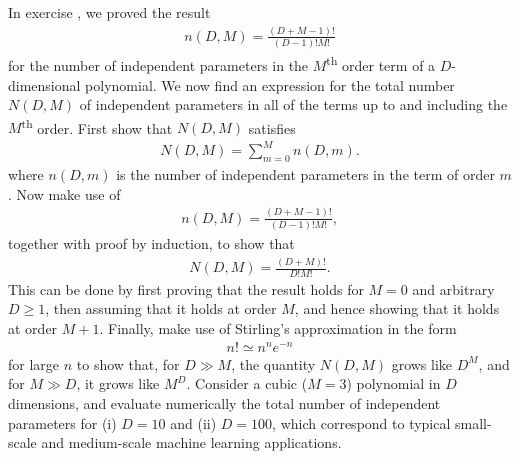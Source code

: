 \begin{question}{1.16}
	In exercise , we proved the result
	\begin{align*}
		n(D, M) = \frac{(D + M - 1)!}{(D-1)!M!}
	\end{align*}
	for the number of independent parameters in the $M$\textsuperscript{th} order term of a $D$-dimensional polynomial. We now find an expression for the total number $N(D, M)$ of independent parameters in all of the terms up to and including the $M$\textsuperscript{th} order. First show that $N(D, M)$ satisfies
	\begin{align*}
		N(D, M) = \sum_{m = 0}^{M} n(D, m).
	\end{align*}
	where $n(D, m)$ is the number of independent parameters in the term of order $m$. Now make use of
	\begin{align*}
		n(D,M) = \frac{(D + M - 1)!}{(D-1)!M!},
	\end{align*}
	together with proof by induction, to show that
	\begin{align*}
		N(D, M) = \frac{(D + M)!}{D!M!}.
	\end{align*}
	This can be done by first proving that the result holds for $M = 0$ and arbitrary $D \geq 1$, then assuming that it holds at order $M$, and hence showing that it holds at order $M + 1$. Finally, make use of Stirling's approximation in the form
	\begin{align*}
		n! \simeq n^n e^{-n}
	\end{align*}
	for large $n$ to show that, for $D \gg M$, the quantity $N(D, M)$ grows like $D^M$, and for $M \gg D$, it grows like $M^D$. Consider a cubic ($M = 3$) polynomial in $D$ dimensions, and evaluate numerically the total number of independent parameters for (i) $D = 10$ and (ii) $D = 100$, which correspond to typical small-scale and medium-scale machine learning applications.
\end{question}

